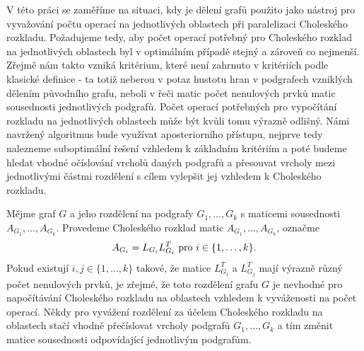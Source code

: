 \documentclass[11pt,american,czech,oneside]{book}
\theoremstyle{plain}
\theoremstyle{definition}
\begin{document}
V této práci se zaměříme na situaci, kdy je dělení grafů použito jako nástroj pro vyvažování počtu operací na jednotlivých oblastech při paralelizaci Choleského rozkladu. Požadujeme tedy, aby počet operací potřebný pro Choleského rozklad na jednotlivých oblastech byl v optimálním případě stejný a zároveň co nejmenší. Zřejmě nám takto vzniká kritérium, které není zahrnuto v kritériích podle klasické definice - ta totiž neberou v potaz hustotu hran v podgrafech vzniklých dělením původního grafu, neboli v řeči matic počet nenulových prvků matic sousednosti jednotlivých podgrafů. Počet operací potřebných pro vypočítání rozkladu na jednotlivých oblastech může být kvůli tomu výrazně odlišný. Námi navržený algoritmus bude využívat aposteriorního přístupu, nejprve tedy nalezneme suboptimální řešení vzhledem k základním kritériím a poté budeme hledat vhodné očíslování vrcholů daných podgrafů a přesouvat vrcholy mezi jednotlivými částmi rozdělení s cílem vylepšit jej vzhledem k Choleského rozkladu.

Mějme graf $G$ a jeho rozdělení na podgrafy $G_1, \ldots, G_k$ s maticemi sousednosti $A_{G_1}, \ldots, A_{G_k}$. Provedeme Choleského rozklad matic $A_{G_1}, \ldots, A_{G_k}$, označme
\[
  A_{G_i} = L_{G_i}L_{G_i}^T \ {\rm pro} \ i \in \{1,\ldots,k\}.
\]
Pokud existují $i,j \in \{1,\ldots,k \}$ takové, že matice $L_{G_i}^T$ a $L_{G_j}^T$ mají výrazně různý počet nenulových prvků, je zřejmé, že toto rozdělení grafu $G$ je nevhodné pro napočítávání Choleského rozkladu na oblastech vzhledem k vyváženosti na počet operací. Někdy pro vyvážení rozdělení za účelem Choleského rozkladu na oblastech stačí vhodně přečíslovat vrcholy podgrafů $G_1, \ldots, G_k$ a tím změnit matice sousednosti odpovídající jednotlivým podgrafům.
\end{document}
